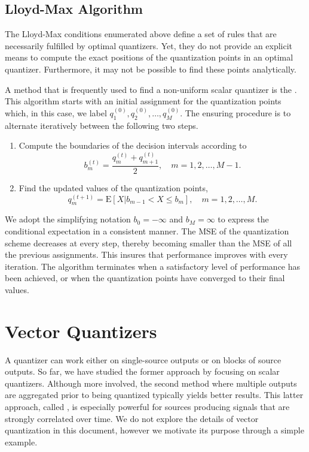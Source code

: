 \subsection{Lloyd-Max Algorithm}

The Lloyd-Max conditions enumerated above define a set of rules that are necessarily fulfilled by optimal quantizers.
Yet, they do not provide an explicit means to compute the exact positions of the quantization points in an optimal quantizer.
Furthermore, it may not be possible to find these points analytically.

A method that is frequently used to find a non-uniform scalar quantizer is the .
This algorithm starts with an initial assignment for the quantization points which, in this case, we label $q_1^{(0)}, q_2^{(0)}, \ldots, q_M^{(0)}$.
The ensuring procedure is to alternate iteratively between the following two steps.
\begin{enumerate}
\item Compute the boundaries of the decision intervals according to
\begin{equation*}
b_m^{(t)} = \frac{q_m^{(t)} + q_{m+1}^{(t)}}{2} , \quad 
m = 1, 2, \ldots, M - 1 .
\end{equation*}
\item Find the updated values of the quantization points,
\begin{equation*}
q_m^{(t+1)} = \mathrm{E} [X | b_{m-1} < X \leq b_m ] , \quad
m = 1, 2, \ldots, M .
\end{equation*}
\end{enumerate}
We adopt the simplifying notation $b_0 = - \infty$ and $b_M = \infty$ to express the conditional expectation in a consistent manner.
The MSE of the quantization scheme decreases at every step, thereby becoming smaller than the MSE of all the previous assignments.
This insures that performance improves with every iteration.
The algorithm terminates when a satisfactory level of performance has been achieved, or when the quantization points have converged to their final values.

\section{Vector Quantizers}

A quantizer can work either on single-source outputs or on blocks of source outputs.
So far, we have studied the former approach by focusing on scalar quantizers.
Although more involved, the second method where multiple outputs are aggregated prior to being quantized typically yields better results.
This latter approach, called , is especially powerful for sources producing signals that are strongly correlated over time.
We do not explore the details of vector quantization in this document, however we motivate its purpose through a simple example.

